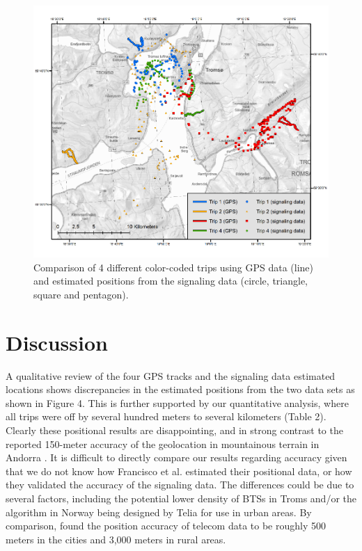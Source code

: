 \documentclass[authordate,empirical, issue]{jote-new-article}
\begin{document}
\begin{figure}[b]
  \begin{fullwidth}



    \centering
    \includegraphics[width=.9\linewidth]{media/image5.png}
    \caption{Comparison of 4 different color-coded trips using GPS data (line) and estimated positions from the signaling data (circle, triangle, square and pentagon).}
    \label{fig:rId12}

  \end{fullwidth}
\end{figure}





\section{Discussion}



A qualitative review of the four GPS tracks and the signaling data estimated locations shows discrepancies in the estimated positions from the two data sets as shown in Figure 4. This is further supported by our quantitative analysis, where all trips were off by several hundred meters to several kilometers (Table 2). Clearly these positional results are disappointing, and in strong contrast to the reported 150-meter accuracy of the geolocation in mountainous terrain in Andorra \parencites{Francisco2018}. It is difficult to directly compare our results regarding accuracy given that we do not know how Francisco et al. estimated their positional data, or how they validated the accuracy of the signaling data. The differences could be due to several factors, including the potential lower density of BTSs in Troms and/or the algorithm in Norway being designed by Telia for use in urban areas. By comparison, \textcite{Jansen2021} found the position accuracy of telecom data to be roughly 500 meters in the cities and 3,000 meters in rural areas.
\end{document}
